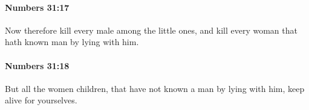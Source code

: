 		\paragraph{Numbers 31:17} %
			\label{NUMBERS-31-17}

			Now therefore kill every male among the little ones, and kill every woman that hath known man by lying with him.


		\paragraph{Numbers 31:18} %
			\label{NUMBERS-31-18}

			But all the women children, that have not known a man by lying with him, keep alive for yourselves.


